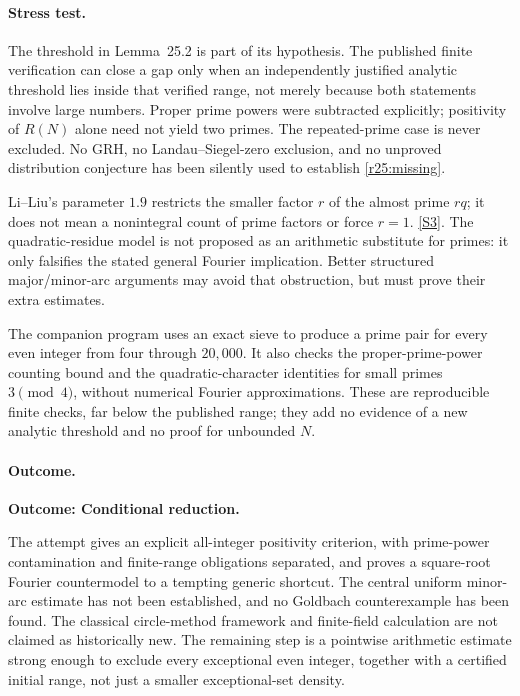 \documentclass[11pt,a4paper]{article}
\newcommand{\sref}[2]{\hyperlink{source:#1:#2}{[S#2]}}
\numberwithin{equation}{section}
\begin{document}
\paragraph{Stress test.}
The threshold in Lemma~25.2 is part of its hypothesis. The published
finite verification can close a gap only when an independently justified
analytic threshold lies inside that verified range, not merely because
both statements involve large numbers. Proper prime powers were
subtracted explicitly; positivity of $R(N)$ alone need not yield two
primes. The repeated-prime case is never excluded. No GRH, no
Landau--Siegel-zero exclusion, and no unproved distribution conjecture
has been silently used to establish \eqref{r25:missing}.

Li--Liu's parameter $1.9$ restricts the smaller factor $r$ of the almost
prime $rq$; it does not mean a nonintegral count of prime factors or force
$r=1$. \sref{statement}{3}. The quadratic-residue model is not proposed as an
arithmetic substitute for primes: it only falsifies the stated general
Fourier implication. Better structured major/minor-arc arguments may
avoid that obstruction, but must prove their extra estimates.

The companion program uses an exact sieve to produce a prime pair for
every even integer from four through $20{,}000$. It also checks the
proper-prime-power counting bound and the quadratic-character identities
for small primes $3\pmod4$, without numerical Fourier approximations.
These are reproducible finite checks, far below the published range;
they add no evidence of a new analytic threshold and no proof for
unbounded $N$.

\paragraph{Outcome.}
\textbf{Outcome: Conditional reduction.}

The attempt gives an explicit all-integer positivity criterion, with
prime-power contamination and finite-range obligations separated, and
proves a square-root Fourier countermodel to a tempting generic shortcut.
The central uniform minor-arc estimate has not been established, and no
Goldbach counterexample has been found. The classical circle-method
framework and finite-field calculation are not claimed as historically
new. The remaining step is a pointwise arithmetic estimate strong enough
to exclude every exceptional even integer, together with a certified
initial range, not just a smaller exceptional-set density.
\end{document}

